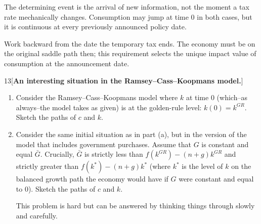 \begin{note}
    The determining event is the arrival of new information, not the moment
    a tax rate mechanically changes. Consumption may jump at time 0 in both
    cases, but it is continuous at every previously announced policy date.
\end{note}

\begin{note}
    Work backward from the date the temporary tax ends. The economy must be
    on the original saddle path then; this requirement selects the unique
    impact value of consumption at the announcement date.
\end{note}

\begin{problem}{13}[\textbf{An interesting situation in the Ramsey--Cass--Koopmans model.}]
\begin{enumerate}[label=(\alph*)]
    \item Consider the Ramsey--Cass--Koopmans model where \(k\) at time 0 (which--as always--the model takes as given) is at the golden-rule level: \(k\left(0\right)=k^{GR}\). Sketch the paths of \(c\) and \(k\).
    \item Consider the same initial situation as in part (a), but in the version of the model that includes government purchases. Assume that \(G\) is constant and equal \(\bar{G}\). Crucially, \(\bar{G}\) is strictly less than \(f\left(k^{GR}\right)-\left(n+g\right)k^{GR}\) and strictly greater than \(f\left(k^*\right)-\left(n+g\right)k^*\) (where \(k^*\) is the level of \(k\) on the balanced growth path the economy would have if \(G\) were constant and equal to 0). Sketch the paths of \(c\) and \(k\). \par {} This problem is hard but can be answered by thinking things through slowly and carefully.
\end{enumerate}
\end{problem}

